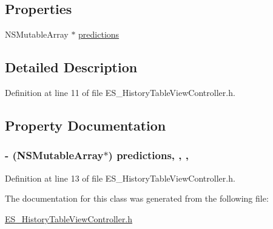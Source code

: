 \subsection*{Properties}
\begin{DoxyCompactItemize}
\item 
N\+S\+Mutable\+Array $\ast$ \hyperlink{interface_e_s___history_table_view_controller_a7dc37a261004b19f76c794438016f8de}{predictions}
\end{DoxyCompactItemize}


\subsection{Detailed Description}


Definition at line 11 of file E\+S\+\_\+\+History\+Table\+View\+Controller.\+h.



\subsection{Property Documentation}
\hypertarget{interface_e_s___history_table_view_controller_a7dc37a261004b19f76c794438016f8de}{
\subsubsection[{predictions}]{\setlength{\rightskip}{0pt plus 5cm}-\/ (N\+S\+Mutable\+Array$\ast$) predictions\hspace{0.3cm}{\ttfamily [read]}, {\ttfamily [write]}, {\ttfamily [nonatomic]}, {\ttfamily [strong]}}}\label{interface_e_s___history_table_view_controller_a7dc37a261004b19f76c794438016f8de}


Definition at line 13 of file E\+S\+\_\+\+History\+Table\+View\+Controller.\+h.



The documentation for this class was generated from the following file\+:\begin{DoxyCompactItemize}
\item 
\hyperlink{_e_s___history_table_view_controller_8h}{E\+S\+\_\+\+History\+Table\+View\+Controller.\+h}\end{DoxyCompactItemize}
